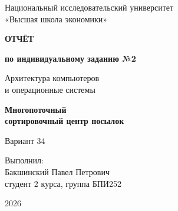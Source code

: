 \documentclass[a4paper,12pt]{article}
\begin{document}
\begin{titlepage}
    \centering
    Национальный исследовательский университет\\[0.4em]
    «Высшая школа экономики»

    \vfill
    \begin{tcolorbox}[myboxstyle,colback=remark_back,colframe=remark_frame,
        boxrule=0.8pt,top=9mm,bottom=9mm]
        \centering
        {\Large\bfseries\color{report_accent} ОТЧЁТ\par}
        \vspace{0.5cm}
        {\large\bfseries по индивидуальному заданию №2\par}
        \vspace{1cm}
        Архитектура компьютеров\\и операционные системы
        \vspace{1cm}

        {\Large\bfseries\color{report_accent} Многопоточный\\сортировочный центр посылок\par}
        \vspace{0.5cm}
        {\large Вариант 34\par}
    \end{tcolorbox}

    \vfill
    \begin{flushright}
        Выполнил:\\[0.4em]
        Бакшинский Павел Петрович\\[0.4em]
        студент 2 курса, группа БПИ252
    \end{flushright}
    \vfill
    \materialsbutton
    \par\vspace{0.8cm}
    2026
\end{titlepage}

\pagestyle{plain}
\setcounter{page}{2}
\setlength{\parskip}{3pt}

\end{document}
